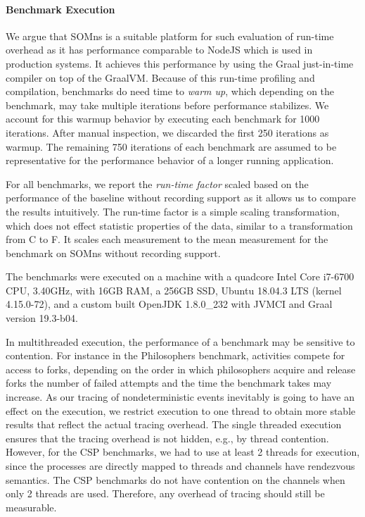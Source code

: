 \documentclass[a4paper,UKenglish,cleveref,autoref]{lipics-v2019}
\def\SOMns{SOM{\sc ns}\xspace}
\begin{document}
\paragraph*{Benchmark Execution}

We argue that \SOMns is a suitable platform for such evaluation of
run-time overhead as it has performance
comparable to NodeJS
which is used in production systems.
It achieves this performance by using
the Graal just-in-time compiler on top of the GraalVM.
%
Because of this run-time profiling and compilation, benchmarks
do need time to \emph{warm up},
which depending on the benchmark, may take
multiple iterations before performance stabilizes.
%
We account for this warmup behavior
by executing each benchmark
for 1000 iterations.
%
After manual inspection,
we discarded the first 250
iterations as warmup.
%
The remaining 750 iterations
of each benchmark
are assumed to be representative
for the performance behavior of a longer running application.

For all benchmarks, we report the \emph{run-time factor} scaled based on the 
performance of the baseline without recording support
as it allows us to compare the results intuitively.
The run-time factor is a simple scaling transformation, which does not effect
statistic properties of the data, similar to a transformation from \textdegree{}C to \textdegree{}F.
It scales each measurement to the mean measurement for the benchmark on \SOMns
without recording support.

The benchmarks were executed on
a machine with a quadcore
Intel Core i7-6700 CPU, 3.40GHz, with 16GB RAM, 
a 256GB SSD, Ubuntu 18.04.3 LTS (kernel 4.15.0-72),
and a custom built OpenJDK 1.8.0\_232
with JVMCI and Graal version 19.3-b04.


In multithreaded execution,
the performance of a benchmark
may be sensitive to contention.
%
For instance in the Philosophers benchmark,
activities compete for access to forks,
depending on the order in which
philosophers acquire and release forks
the number of failed attempts
and the time the benchmark takes may increase.
%
As our tracing of nondeterministic events
inevitably is going
to have an effect on
the execution,
we restrict execution
to one thread
to obtain more stable results
that reflect the actual tracing overhead.
%
The single threaded
execution ensures
that the tracing overhead
is not hidden, e.g., by thread contention.
%
However, for the CSP benchmarks,
we had to use at least 2 threads
for execution, since the processes are directly mapped to threads
and channels have rendezvous semantics.
%
The CSP benchmarks do not have contention
on the channels when only 2 threads are used.
Therefore, any overhead of tracing should still be measurable.
\end{document}
